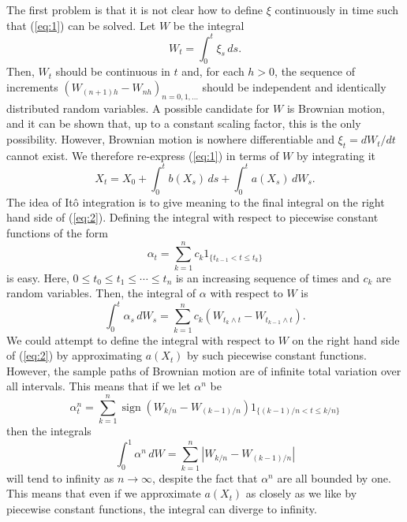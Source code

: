 \documentclass[12pt]{article}
\begin{document}
The first problem is that it is not clear how to define $\xi$ continuously in time such that (\ref{eq:1}) can be solved. Let $W$ be the integral
\begin{equation*}
W_t=\int_0^t\xi_s\,ds.
\end{equation*}
Then, $W_t$ should be continuous in $t$ and, for each $h>0$, the sequence of increments $(W_{(n+1)h}-W_{nh})_{n=0,1,\ldots}$ should be independent and identically distributed random variables. A possible candidate for $W$ is Brownian motion, and it can be shown that, up to a constant scaling factor, this is the only possibility.
However, Brownian motion is nowhere differentiable and $\xi_t=dW_t/dt$ cannot exist. We therefore re-express (\ref{eq:1}) in terms of $W$ by integrating it
\begin{equation}\label{eq:2}
X_t=X_0+\int_0^tb(X_s)\,ds+\int_0^ta(X_s)\,dW_s.
\end{equation}
The idea of It\^o integration is to give meaning to the final integral on the right hand side of (\ref{eq:2}).
Defining the integral with respect to piecewise constant functions of the form
\begin{equation}\label{eq:3}
\alpha_t = \sum_{k=1}^n c_k 1_{\{t_{k-1}<t\le t_k\}}
\end{equation}
is easy. Here, $0\le t_0\le t_1\le\cdots\le t_n$ is an increasing sequence of times and $c_k$ are random variables. Then, the integral of $\alpha$ with respect to $W$ is
\begin{equation}\label{eq:4}
\int_0^t\alpha_s\,dW_s = \sum_{k=1}^n c_k \left(W_{t_{k}\wedge t}-W_{t_{k-1}\wedge t}\right).
\end{equation}
We could attempt to define the integral with respect to $W$ on the right hand side of (\ref{eq:2}) by approximating $a(X_t)$ by such piecewise constant functions. However, the sample paths of Brownian motion are of infinite total variation over all intervals. This means that if we let $\alpha^n$ be
\begin{equation*}
\alpha^n_t = \sum_{k=1}^n \operatorname{sign}(W_{k/n}-W_{(k-1)/n}) 1_{\{(k-1)/n<t\le k/n\}}
\end{equation*}
then the integrals
\begin{equation*}
\int_0^1\alpha^n\,dW=\sum_{k=1}^n\left|W_{k/n}-W_{(k-1)/n}\right|
\end{equation*}
will tend to infinity as $n\rightarrow\infty$, despite the fact that $\alpha^n$ are all bounded by one. This means that even if we approximate $a(X_t)$ as closely as we like by piecewise constant functions, the integral can diverge to infinity.
\end{document}

